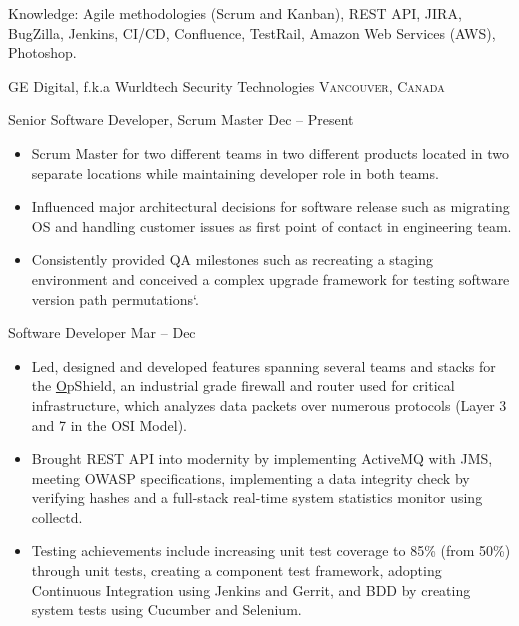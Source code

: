 \documentclass[10pt,a4paper]{article}
\begin{document}
\inlineheadsection 
  {Knowledge:}
  {Agile methodologies (Scrum and Kanban), REST API, JIRA, BugZilla, Jenkins, CI/CD, Confluence, TestRail, Amazon Web Services (AWS), Photoshop.}

\vspace{2em}
\spacedhrule{0em}{-0.4em}


\headedsection  %
  {{GE Digital, f.k.a Wurldtech Security Technologies}}
  {\textsc{Vancouver, Canada}} {%
  \headedsubsection
    {Senior Software Developer, Scrum Master}
    {Dec  -- Present}
   {\noindent\begin{itemize}  \item Scrum Master for two different teams in two different products located in two separate locations while maintaining developer role in both teams.
\item Influenced major architectural decisions for software release such as migrating OS and handling customer issues as first point of contact in engineering team.
\item Consistently provided QA milestones such as recreating a staging environment and conceived a complex upgrade framework for testing software version path permutations`. 
\end{itemize}}
    
  \headedsubsection
    {Software Developer}
    {Mar  -- Dec }
    {\noindent\begin{itemize}  \item Led, designed and developed features spanning several teams and stacks for the \href{https://www.ge.com/digital/asset/opshield-ge-digital}OpShield, an industrial
grade firewall and router used for critical infrastructure, which analyzes data packets over numerous protocols (Layer
3 and 7 in the OSI Model).
\item Brought REST API into modernity by implementing ActiveMQ
with JMS, meeting OWASP specifications, implementing a data integrity check by verifying hashes and a full-stack real-time system statistics monitor using collectd.
\item Testing achievements include increasing unit test coverage to 85\% (from 50\%) through unit tests, creating a component test framework, adopting Continuous Integration using Jenkins and Gerrit, and BDD by creating system tests using Cucumber and Selenium.
\end{itemize}}
}
\end{document}
